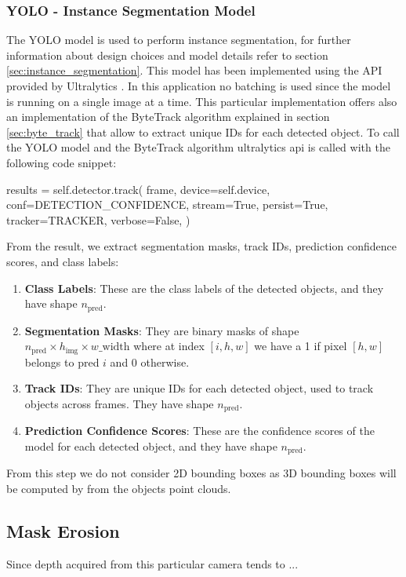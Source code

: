 \subsubsection[YOLO]{YOLO - Instance Segmentation Model}
The YOLO model is used to perform instance segmentation, for further information about 
design choices and model details refer to section \ref{sec:instance_segmentation}.
This model has been implemented using the API provided by Ultralytics \cite{ultralytics_yolo_2023}.
In this application no batching is used since the model is running on a single image at a time.
This particular implementation offers also an implementation of the ByteTrack algorithm explained in section 
\ref{sec:byte_track} that allow to extract unique IDs for each detected object.
To call the YOLO model and the ByteTrack algorithm ultralytics api is called with the following code snippet:
\begin{python}
results = self.detector.track(
                frame,
                device=self.device,
                conf=DETECTION_CONFIDENCE,
                stream=True,
                persist=True,
                tracker=TRACKER,
                verbose=False,
            )
\end{python}
From the result, we extract segmentation masks, track IDs, prediction confidence scores, and class labels:
\begin{enumerate}
    \item \textbf{Class Labels}: These are the class labels of the detected objects, and they have shape \( n_{\text{pred}} \).
    \item \textbf{Segmentation Masks}: They are binary masks of shape \( n_{\text{pred}} \times h_{\text{img}} \times w\_{\text{width}} \) where at index \( [i, h, w] \) we have a 1 if pixel \( [h, w] \) belongs to pred \( i \) and 0 otherwise.
    \item \textbf{Track IDs}: They are unique IDs for each detected object, used to track objects across frames. They have shape \( n_{\text{pred}} \).
    \item \textbf{Prediction Confidence Scores}: These are the confidence scores of the model for each detected object, and they have shape \( n_{\text{pred}} \).
\end{enumerate}
From this step we do not consider 2D bounding boxes as 3D bounding boxes will be computed by from the objects point clouds.
\subsection[Mask Erosion]{Mask Erosion}
Since depth acquired from this particular camera tends to ...
